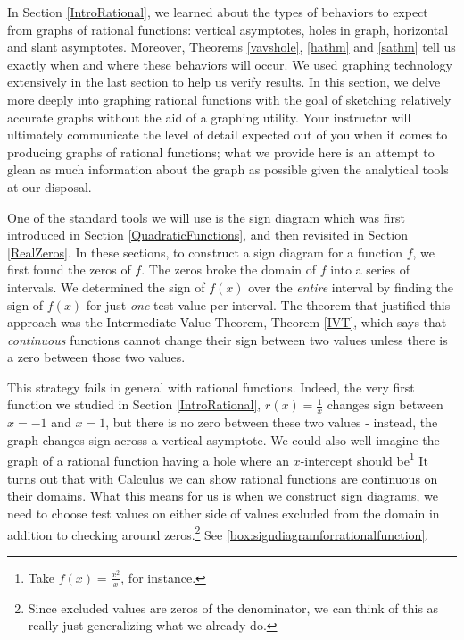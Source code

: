 
\setcounter{footnote}{0}

\label{RationalGraphs}

In Section \ref{IntroRational}, we learned about the types of behaviors to expect from graphs of rational functions: vertical asymptotes, holes in graph, horizontal and slant asymptotes.   Moreover,  Theorems \ref{vavshole}, \ref{hathm} and \ref{sathm} tell us exactly when and where these behaviors will occur.  We used graphing technology extensively in the last section to help us verify results. In this section, we delve more deeply into graphing rational functions with the goal of sketching relatively accurate graphs without the aid of a graphing utility.  Your instructor will ultimately communicate the level of detail expected out of you when it comes to producing graphs of rational functions;  what we provide here is an attempt to glean as much information about the graph as possible given the analytical tools at our disposal.  

One of the standard tools we will use is the sign diagram which was first introduced in Section \ref{QuadraticFunctions}, and then revisited in Section \ref{RealZeros}. In these sections,  to construct a sign diagram for a function $f$, we first found the zeros of $f$.  The zeros broke  the domain of $f$ into a series of intervals.  We determined the sign of $f(x)$ over the \textit{entire} interval by finding the sign of $f(x)$ for just \textit{one} test value per interval.  The theorem that justified this approach was the Intermediate Value Theorem, Theorem \ref{IVT}, which says that \textit{continuous} functions cannot change their sign between two values unless there is a zero  between those two values. 

This strategy fails in  general with rational functions.  Indeed, the very first  function we studied in Section \ref{IntroRational}, $r(x) = \frac{1}{x}$ changes sign between $x=-1$ and $x=1$, but there is no zero between these two values - instead, the graph changes sign across a vertical asymptote.  We could also well imagine the graph of a rational function having a hole where an $x$-intercept should be\footnote{Take $f(x) = \frac{x^2}{x}$, for instance.}  It turns out that with Calculus we can show rational functions are continuous on their domains.  What this means for us is when we construct sign diagrams, we need to choose test values on either side of values excluded from the domain in addition to checking around zeros.\footnote{Since excluded values are zeros of the denominator, we can think of this as really just generalizing what we already do.} See \autoref{box:signdiagramforrationalfunction}.

